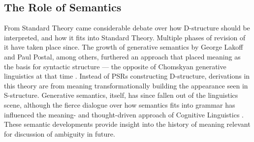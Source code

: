 \documentclass{article}
\begin{document}
\subsection{The Role of Semantics}
From Standard Theory came considerable debate over how D-structure should be interpreted, and how it fits into Standard Theory. Multiple phases of revision of it have taken place since. The growth of generative semantics by George Lakoff and Paul Postal, among others, furthered an approach that placed meaning as the basis for syntactic structure --- the opposite of Chomskyan generative linguistics at that time \citep{Lakoff71, Lakoff76}. Instead of PSRs constructing D-structure, derivations in this theory are from meaning transformationally building the appearance seen in S-structure. Generative semantics, itself, has since fallen out of the linguistics scene, although the fierce dialogue over how semantics fits into grammar has influenced the meaning- and thought-driven approach of Cognitive Linguistics \citep[see][]{Harris2021, Lakoff76, Langacker86}. These semantic developments provide insight into the history of meaning relevant for discussion of ambiguity in future.
\end{document}
